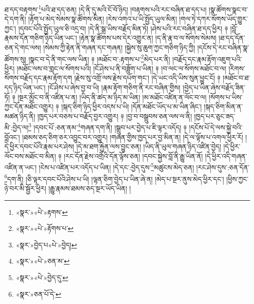 ཐ་དད་བརྟགས་\footnote{«སྣར་»«པེ་»རྟགས་}པའི་ཐ་དད་ཅན། །དེ་ནི་དུ་མའི་ངོ་བོ་ཉིད། །བརྟགས་པའི་རང་བཞིན་ཐ་དད་པ། །སྣ་ཚོགས་སྣང་བ་དེ་དག་ནི། །རྟོག་པ་མེད་སེམས་སྣ་ཚོགས་མིན། །རེས་འགའ་པ་ཡི་སྤྱོད་ཡུལ་མིན། །གལ་ཏེ་དཀར་སོགས་ཡོད་གྱུར་ཀྱང་། །དབང་པོའི་སྤྱོད་ཡུལ་ཅི་འདྲ་བ། །དེ་ནི་སྒྲ་ཡིས་བརྗོད་མིན་ཏེ། །ཤེས་པའི་རང་བཞིན་ཐ་དད་ཕྱིར། ༈ །བློ་རྣམས་དོན་གཅིག་ཉིད་ཡིན་ཡང་། །རྟེན་སྣ་ཚོགས་པས་དེར་འགྱུར་ན། །ད་ནི་རྣ་བ་ལ་སོགས་སེམས། །ཐ་དད་དོན་ཅན་དེ་གང་ལས། །སེམས་ཀྱི་རྟེན་ནི་གཞན་དང་གཞན། །སྐྱེས་སུ་ཆུག་ཀྱང་གཅིག་ཉིད་ཀྱི། །དངོས་དེ་རང་བཞིན་སྣ་ཚོགས་སུ། །སྣང་བ་དེ་ནི་གང་ལས་ཡིན། ༈ །མཐོང་བ་:རྟགས་པ་\footnote{«སྣར་»«པེ་»རྟོགས་པ་}མེད་པར་ནི། །བརྗོད་དང་རྣམ་རྟོག་འཇུག་པའི་ཕྱིར། །མཐོང་ལས་བ་གླང་ལ་སོགས་པའི། །ངོ་ཤེས་པ་ནི་བཟློག་པ་ཡིན། ༈ །བ་ལང་ལ་སོགས་མཐོང་བ་ལ། །རིགས་སོགས་བརྗོད་དང་རྣམ་རྟོག་དག །རྗེས་སུ་འགྲོ་ལས་རྗེས་དཔོག་གང་། །དེ་ཡང་འདི་ཡིས་སུན་ཕྱུང་ངོ། ༈ །མཐོང་བ་ཐ་དད་ཉིད་ཡིན་ཡང་། །ངོ་ཤེས་པ་ཞེས་བྱ་བ་ཡི། །རྣམ་རྟོག་གཅིག་ནི་རང་བཞིན་གྱིས། །བྱེད་པ་ཡིན་ཞེས་བརྗོད་ཟིན་ཏོ། ༈ །སྔར་མྱོང་བ་ནི་འཛིན་པ་ན། །ཡིད་ནི་ཚད་མ་ཉིད་མ་ཡིན། །མ་མཐོང་འཛིན་ན་ལོང་བ་ལ། །སོགས་པ་ཡིས་ཀྱང་དོན་མཐོང་འགྱུར། ༈ །སྐད་ཅིག་ཉིད་ཕྱིར་འདས་པ་ཡི། །དོན་མཐོང་ཡོད་པ་མ་ཡིན་ཞིང་། །སྐད་ཅིག་མིན་ན་མཚན་ཉིད་ནི། །ཁྱད་པར་བཅས་པ་བརྗོད་བྱར་འགྱུར། ༈ །བྱ་བ་བསྒྲུབས་ཅན་ལས་ལ་ནི། །ཁྱད་པར་ཅུང་ཟད་མི་:བྱེད་ལ།\footnote{«སྣར་»བྱེད་པ«པེ་»བྱེད།} །དབང་པོ་:ཅན་ནམ་\footnote{«སྣར་»«པེ་»ཅན་མ་}གཞན་དག་ནི། །སྒྲུབ་པར་བྱེད་པ་ཇི་ལྟར་འདོད། ༈ །དངོས་པོ་དེ་ལས་སྐྱེ་བའི་བློའང་། །ཐམས་ཅད་ཅིག་ཅར་འབྱུང་བར་འགྱུར། །གཞན་གྱིས་ཁྱད་པར་བྱ་མིན་ན། །དེ་ལ་ལྟོས་པ་འགལ་ཕྱིར་རོ། །དེ་ཕྱིར་དབང་པོའི་རྣམ་པར་ཤེས། །དེ་མ་ཐག་རྐྱེན་ལས་བྱུང་ཅན། །ཡིད་ནི་ཡུལ་གཞན་ཉིད་འཛིན་བྱེད། །དེ་ཕྱིར་ལོང་བས་མཐོང་བ་མིན། ༈ །རང་དོན་རྗེས་འགྲོའི་དོན་ལྟོས་ཅན། །དབང་སྐྱེས་བློ་ནི་རྒྱུ་ཡིན་ནོ། །དེ་ཕྱིར་འདི་གཞན་འཛིན་ན་ཡང་། །ངེས་པ་འཛིན་པར་འདོད་པ་ཡིན། །དེ་དང་:བྱེད་དུས་\footnote{«སྣར་»«པེ་»བྱེད་དུ་}མཚུངས་མེད་ཅན། །རང་ཤེས་དུས་:ཅན་དོན་\footnote{«སྣར་»ཅན་པོ་དེ་}དག་ནི། །ཅི་ལྟར་དབང་པོའི་ཤེས་པ་ཡི། །ལྷན་ཅིག་བྱེད་པ་ཡིན་ཞེ་ན། །མེད་པ་སྔར་ནུས་མེད་ཕྱིར་དང་། །ཕྱིས་ཀྱང་ཉེ་བར་མི་སྦྱོར་ཕྱིར། །རྒྱུ་རྣམས་ཐམས་ཅད་སྔར་ཡོད་ཡིན། །
